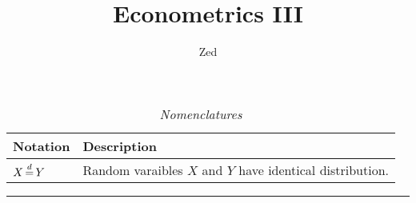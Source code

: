 \documentclass[a4paper, 10pt]{article}
\title{\textbf{Econometrics III}}
\author{Zed}
\renewcommand{\arraystretch}{1.4}
\theoremstyle{definition}
\theoremstyle{hSol}
\begin{document}
\maketitle

\begin{table}[h]
\vspace{-10pt}
\caption{\textit{Nomenclatures}}
\vspace{3pt}
\centering
\def\arraystretch{1.15}
\begin{tabular}{lL}
\hline
Notation & \hspace{4.6cm} Description \\ 
\hline
$X\,{\buildrel d \over =}\,Y$ & Random varaibles $X$ and $Y$ have identical distribution.\\
\hline 
\end{tabular}
\label{tab:Nomen}
\end{table}


\noindent\rule{16cm}{0.4pt}
\end{document}
